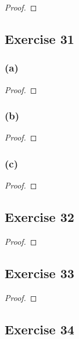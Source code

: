 \documentclass[14pt]{extarticle}
\begin{document}
\begin{proof}

\end{proof}

\subsection{Exercise 31}

\subsubsection{(a)}

\begin{proof}

\end{proof}

\subsubsection{(b)}

\begin{proof}

\end{proof}

\subsubsection{(c)}

\begin{proof}

\end{proof}

\subsection{Exercise 32}

\begin{proof}

\end{proof}

\subsection{Exercise 33}

\begin{proof}

\end{proof}

\subsection{Exercise 34}
\end{document}
